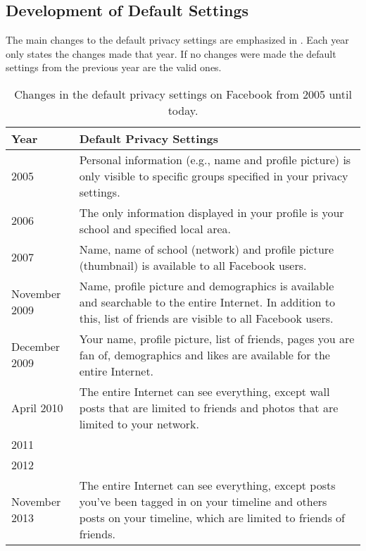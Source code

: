 \subsection{Development of Default Settings}




The main changes to the default privacy settings are emphasized in . Each year only states the changes made that year. If no changes were made the default settings from the previous year are the valid ones. 

\begin{center}
\begin{table}[!ht]
\caption{\label{tab:dps}Changes in the default privacy settings on Facebook from 2005 until today. \cite{EvoPriv,PrivTimeline}}
    \begin{tabular}{ | l | p{9cm} |}
    \hline
    \textbf{Year} & \textbf{Default Privacy Settings} \\ 
    \hline
    2005 & Personal information (e.g., name and profile picture) is 	only visible to specific groups specified in your privacy 			settings.\\ 
    \hline
    2006 & The only information displayed in your profile is your 		school and specified local area. \\ 
    \hline
    2007 & Name, name of school (network) and profile picture 			(thumbnail) is available to all Facebook users.\\
    \hline
    November 2009 & Name, profile picture and demographics is 			available and searchable to the entire Internet. In addition to 	this, list of friends are visible to all Facebook users.\\
	\hline
    December 2009 & Your name, profile picture, list of friends, 		pages you are fan of, demographics and likes are available for 		the entire Internet.\\
    \hline
    April 2010 & The entire Internet can see everything, except 		wall posts that are limited to friends and photos that are 			limited to your network. \\
    \hline
    2011 &  \\
    \hline
    2012 & \\
    \hline
    November 2013 & The entire Internet can see everything, except posts you've been tagged in on your timeline and others posts on your timeline, which are limited to friends of friends. \\ 
    \hline
    \end{tabular}
   \end{table}
\end{center}  

